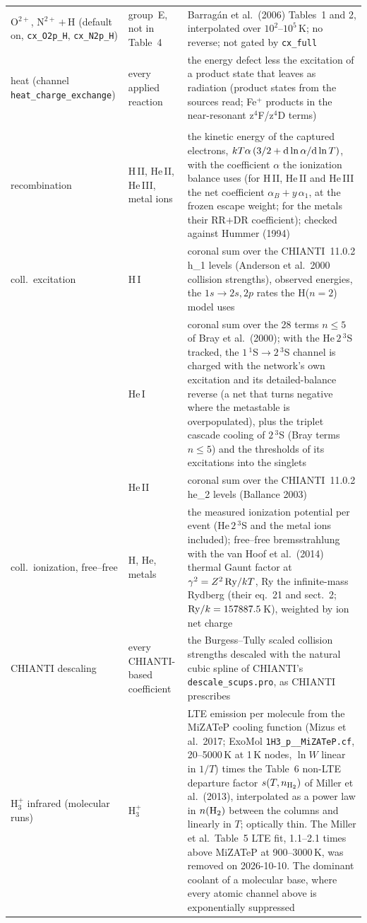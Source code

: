 \documentclass[english,a4paper]{my_memo}
\begin{document}
\begin{longtable}{@{}>{\raggedright\arraybackslash\hyphenpenalty=10000\exhyphenpenalty=10000}p{}p{}p{}@{}}
O$^{2+}$, N$^{2+}$\,$+$\,H (default on, \texttt{cx\_O2p\_H}, \texttt{cx\_N2p\_H}) & group~E, not in Table~4 & Barrag\'an et al.\ (2006) Tables~1 and 2, interpolated over $10^2$--$10^5$\,K; no reverse; not gated by \texttt{cx\_full} \\
heat (channel \texttt{heat\_charge\_}\allowbreak\texttt{exchange}) & every applied reaction & the energy defect less the excitation of a product state that leaves as radiation (product states from the sources read; Fe$^+$ products in the near-resonant z$^4$F/z$^4$D terms) \\
\midrule
\multicolumn{3}{@{}l}{\textbf{Radiative cooling}}\\[2pt]
recombination & H\,II, He\,II, He\,III, metal ions & the kinetic energy of the captured electrons, $kT\alpha\,(3/2+{\rm d}\ln\alpha/{\rm d}\ln T)$, with the coefficient $\alpha$ the ionization balance uses (for H\,II, He\,II and He\,III the net coefficient $\alpha_B+y\,\alpha_1$, at the frozen escape weight; for the metals their RR$+$DR coefficient); checked against Hummer (1994) \\
coll.\ excitation & H\,I & coronal sum over the CHIANTI~11.0.2 h\_1 levels (Anderson et al.\ 2000 collision strengths), observed energies, the $1s\to2s,2p$ rates the H($n{=}2$) model uses \\
 & He\,I & coronal sum over the 28 terms $n\le5$ of Bray et al.\ (2000); with the He\,$2\,^3$S tracked, the $1\,^1$S$\to2\,^3$S channel is charged with the network's own excitation and its detailed-balance reverse (a net that turns negative where the metastable is overpopulated), plus the triplet cascade cooling of $2\,^3$S (Bray terms $n\le5$) and the thresholds of its excitations into the singlets \\
 & He\,II & coronal sum over the CHIANTI~11.0.2 he\_2 levels (Ballance 2003) \\
coll.\ ionization, free--free & H, He, metals & the measured ionization potential per event (He\,$2\,^3$S and the metal ions included); free--free bremsstrahlung with the van Hoof et al.\ (2014) thermal Gaunt factor at $\gamma^2=Z^2\,{\rm Ry}/kT$, Ry the infinite-mass Rydberg (their eq.~21 and sect.~2; ${\rm Ry}/k=157887.5$\,K), weighted by ion net charge \\
CHIANTI descaling & every CHIANTI-based coefficient & the Burgess--Tully scaled collision strengths descaled with the natural cubic spline of CHIANTI's \texttt{descale\_scups.pro}, as CHIANTI prescribes \\
H$_3^+$ infrared (molecular runs) & H$_3^+$ & LTE emission per molecule from the MiZATeP cooling function (Mizus et al.\ 2017; ExoMol \texttt{1H3\_p\_\_MiZATeP.cf}, 20--5000\,K at 1\,K nodes, $\ln W$ linear in $1/T$) times the Table~6 non-LTE departure factor $s(T,n_{\rm H_2})$ of Miller et al.\ (2013), interpolated as a power law in $n({\rm H_2})$ between the columns and linearly in $T$; optically thin. The Miller et al.\ Table~5 LTE fit, 1.1--2.1 times above MiZATeP at 900--3000\,K, was removed on 2026-10-10. The dominant coolant of a molecular base, where every atomic channel above is exponentially suppressed \\

\end{longtable}
\end{document}
